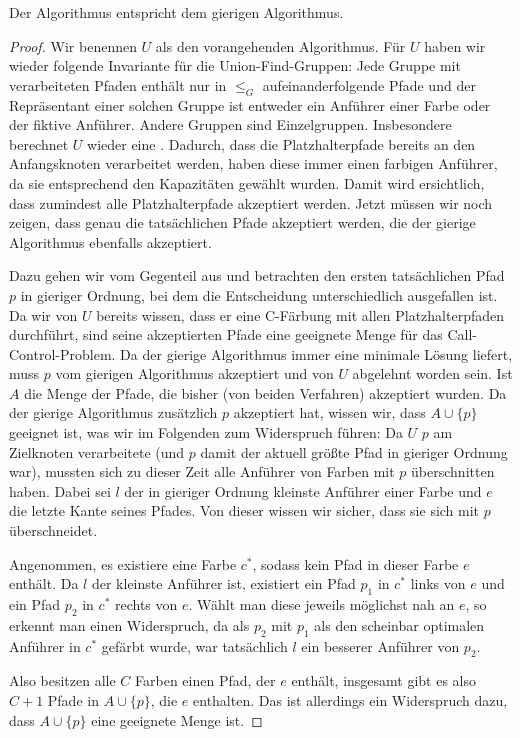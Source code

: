 \begin{lemma}
    Der  Algorithmus entspricht dem gierigen Algorithmus.
\end{lemma}
\begin{proof}
    Wir benennen $U$ als den vorangehenden Algorithmus.
    Für $U$ haben wir wieder folgende Invariante für die Union-Find-Gruppen:
    Jede Gruppe mit verarbeiteten Pfaden enthält nur in $\leq_G$ aufeinanderfolgende Pfade und der Repräsentant einer
    solchen Gruppe ist entweder ein Anführer einer Farbe oder der fiktive Anführer.
    Andere Gruppen sind Einzelgruppen.
    Insbesondere berechnet $U$ wieder eine .
    Dadurch, dass die Platzhalterpfade bereits an den Anfangsknoten verarbeitet werden, haben diese immer einen farbigen
    Anführer, da sie entsprechend den Kapazitäten gewählt wurden.
    Damit wird ersichtlich, dass zumindest alle Platzhalterpfade akzeptiert werden.
    Jetzt müssen wir noch zeigen, dass genau die tatsächlichen Pfade akzeptiert werden, die der gierige Algorithmus
    ebenfalls akzeptiert.

    Dazu gehen wir vom Gegenteil aus und betrachten den ersten tatsächlichen Pfad $p$ in gieriger Ordnung, bei dem die
    Entscheidung unterschiedlich ausgefallen ist.
    Da wir von $U$ bereits wissen, dass er eine C-Färbung mit allen Platzhalterpfaden durchführt, sind
    seine akzeptierten Pfade eine geeignete Menge für das Call-Control-Problem.
    Da der gierige Algorithmus immer eine minimale Lösung liefert, muss $p$ vom gierigen Algorithmus akzeptiert und von
    $U$ abgelehnt worden sein.
    Ist $A$ die Menge der Pfade, die bisher (von beiden Verfahren) akzeptiert wurden.
    Da der gierige Algorithmus zusätzlich $p$ akzeptiert hat, wissen wir, dass $A \cup \{p\}$ geeignet ist, was wir
    im Folgenden zum Widerspruch führen:
    Da $U$ $p$ am Zielknoten verarbeitete (und $p$ damit der aktuell größte Pfad in gieriger Ordnung
    war), mussten sich zu dieser Zeit alle Anführer von Farben mit $p$ überschnitten haben.
    Dabei sei $l$ der in gieriger Ordnung kleinste Anführer einer Farbe und $e$ die letzte Kante seines Pfades.
    Von dieser wissen wir sicher, dass sie sich mit $p$ überschneidet.

    Angenommen, es existiere eine Farbe $c^*$, sodass kein Pfad in dieser Farbe $e$ enthält.
    Da $l$ der kleinste Anführer ist, existiert ein Pfad $p_1$ in $c^*$ links von $e$ und ein Pfad $p_2$ in $c^*$
    rechts von $e$.
    Wählt man diese jeweils möglichst nah an $e$, so erkennt man einen Widerspruch, da als $p_2$ mit $p_1$ als den
    scheinbar optimalen Anführer in $c^*$ gefärbt wurde, war tatsächlich $l$ ein besserer Anführer von $p_2$.

    Also besitzen alle $C$ Farben einen Pfad, der $e$ enthält, insgesamt gibt es also $C+1$ Pfade in $A \cup \{p\}$, die
    $e$ enthalten.
    Das ist allerdings ein Widerspruch dazu, dass $A \cup \{p\}$ eine geeignete Menge ist.
\end{proof}

